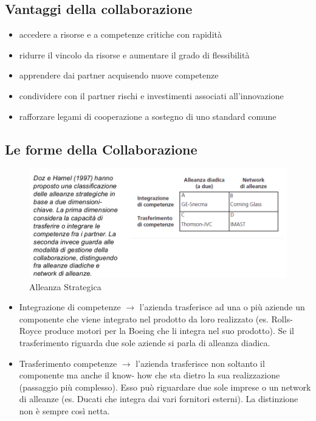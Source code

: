 \documentclass{article}
\begin{document}
\subsection{Vantaggi della collaborazione}
\begin{itemize}
\item accedere a risorse e a competenze critiche con rapidità
\item ridurre il vincolo da risorse e aumentare il grado di flessibilità
\item  apprendere dai partner acquisendo nuove competenze
\item  condividere con il partner rischi e investimenti associati
all’innovazione
\item rafforzare legami di cooperazione a sostegno di uno standard comune
\end{itemize}

\subsection{Le forme della Collaborazione}
\begin{figure}[h!]
	\centering
	\includegraphics[scale=0.4]{images/allez_stra.png}
	\caption{Alleanza Strategica}
	\label{fig:Porter2}
\end{figure}
\begin{itemize}
\item Integrazione di competenze $\rightarrow$ l’azienda trasferisce ad una o più aziende un componente che
viene integrato nel prodotto da loro realizzato (es. Rolls-Royce produce motori per la Boeing che li
integra nel suo prodotto). Se il trasferimento riguarda due sole aziende si parla di alleanza diadica.
\item Trasferimento competenze $\rightarrow$ l’azienda trasferisce non soltanto il componente ma anche il know-
how che sta dietro la sua realizzazione (passaggio più complesso). Esso può riguardare due sole
imprese o un network di alleanze (es. Ducati che integra dai vari fornitori esterni).
La distinzione non è sempre così netta. 
\end{itemize}
\end{document}
